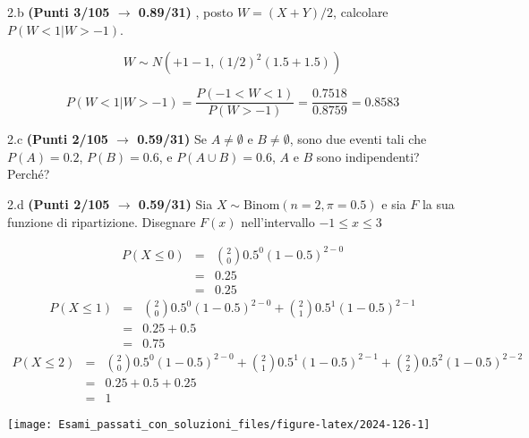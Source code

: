 \documentclass[
  11pt,
]{book}
\theoremstyle{mytheoremstyle}
\theoremstyle{mydefstyle}
\newenvironment{sol}
  {
  \begin{tcolorbox}[enhanced,breakable,arc=0.1mm,boxrule=1pt,colback=white,colframe=iblue,
  title=\bf \fontfamily{lmss}\selectfont \hspace{.5 cm} Soluzione,drop fuzzy shadow]

}{
\end{tcolorbox}
  }
\begin{document}
2.b \textbf{(Punti 3/105 \(\rightarrow\) 0.89/31)} , posto \(W=(X+Y)/2\), calcolare \(P(W<1|W>-1)\).

\begin{sol}
\[
W\sim N(+1-1,(1/2)^2(1.5+1.5))
\]

\[ 
P(W<1|W>-1)=\frac{P(-1<W<1)}{P(W>-1)}=\frac{0.7518}{0.8759}=0.8583
\]

\end{sol}

2.c \textbf{(Punti 2/105 \(\rightarrow\) 0.59/31)} Se \(A\neq\emptyset\) e \(B\neq\emptyset\), sono due eventi tali che \(P(A)=0.2\), \(P(B)=0.6\), e \(P(A\cup B)=0.6\), \(A\) e \(B\) sono indipendenti? Perché?

2.d \textbf{(Punti 2/105 \(\rightarrow\) 0.59/31)} Sia \(X\sim\text{Binom}(n=2,\pi=0.5)\) e sia \(F\) la sua funzione di ripartizione. Disegnare \(F(x)\) nell'intervallo \(-1\leq x\leq 3\)

\begin{sol}

\normalsize 
\begin{eqnarray*}
      P( X \leq 0 ) &=& \binom{ 2 }{ 0 } 0.5 ^{ 0 }(1- 0.5 )^{ 2 - 0 } \\                 &=& 0.25 \\                 &=& 0.25 
   \end{eqnarray*}
\normalsize  \normalsize 
\begin{eqnarray*}
      P( X \leq 1 ) &=& \binom{ 2 }{ 0 } 0.5 ^{ 0 }(1- 0.5 )^{ 2 - 0 }+\binom{ 2 }{ 1 } 0.5 ^{ 1 }(1- 0.5 )^{ 2 - 1 } \\                 &=& 0.25+0.5 \\                 &=& 0.75 
   \end{eqnarray*}
\normalsize  \normalsize 
\begin{eqnarray*}
      P( X \leq 2 ) &=& \binom{ 2 }{ 0 } 0.5 ^{ 0 }(1- 0.5 )^{ 2 - 0 }+\binom{ 2 }{ 1 } 0.5 ^{ 1 }(1- 0.5 )^{ 2 - 1 }+\binom{ 2 }{ 2 } 0.5 ^{ 2 }(1- 0.5 )^{ 2 - 2 } \\                 &=& 0.25+0.5+0.25 \\                 &=& 1 
   \end{eqnarray*}
\normalsize 

\begin{center}\texttt{[image: Esami\_passati\_con\_soluzioni\_files/figure-latex/2024-126-1]} \end{center}

\end{sol}
\end{document}
